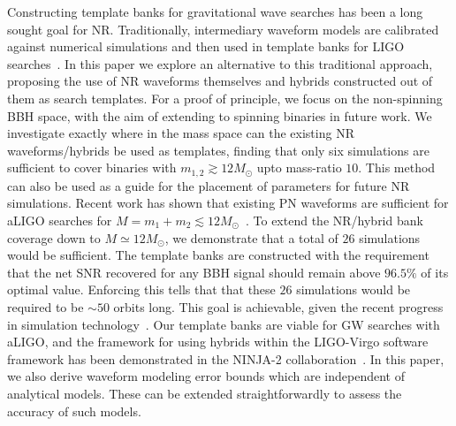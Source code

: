 \documentclass[aps,
prd,
twocolumn,
superscriptaddress,
lengthcheck,showpacs,letterpaper,nofootinbib,
floatfix]{revtex4-1}
\begin{document}
Constructing template banks for gravitational wave searches has
been a long sought goal for NR. Traditionally, intermediary waveform
models are calibrated against numerical simulations and then
used in template banks for LIGO searches~\cite{Abadie:2011kd,
Aasi:2012rja}. In this paper we explore an alternative to this
traditional approach, proposing the use of NR waveforms themselves
and hybrids constructed out of them as search templates.
For a proof of principle, we focus on the non-spinning BBH space, 
with the aim of extending to spinning binaries in future work. We
investigate exactly where in the mass space can the existing NR 
waveforms/hybrids be used as templates, finding that only six 
simulations are sufficient to cover binaries with 
$m_{1,2}\gtrsim 12M_\odot$ upto mass-ratio $10$. This method can
also be used as a guide for the placement of parameters for future
NR simulations. Recent work has shown that existing PN waveforms 
are sufficient for aLIGO searches for 
$M=m_1+m_2\lesssim 12M_\odot$~\cite{CompTemplates2009,Brown:2012nn}.
To extend the NR/hybrid bank coverage down to 
$M\simeq 12M_\odot$, we demonstrate that a total of $26$ 
simulations would be sufficient. The template banks are 
constructed with the requirement that the net SNR recovered for 
any BBH signal should remain above $96.5\%$ of its optimal value.
Enforcing this tells that that these $26$ simulations would be 
required to be $\sim 50$ orbits long. This goal is achievable,
given the recent progress in simulation 
technology~\cite{MacDonald:2012mp,Mroue:2013xna,BelaLongSimulation}. 
Our template banks are viable for GW searches with aLIGO, and the 
framework for using hybrids within the LIGO-Virgo software 
framework has been demonstrated in the NINJA-2
collaboration~\cite{NINJA2:2013inPrep}. In this paper, we also 
derive waveform modeling error bounds which are independent of
analytical models. These can be extended straightforwardly to 
assess the accuracy of such models.

\end{document}
